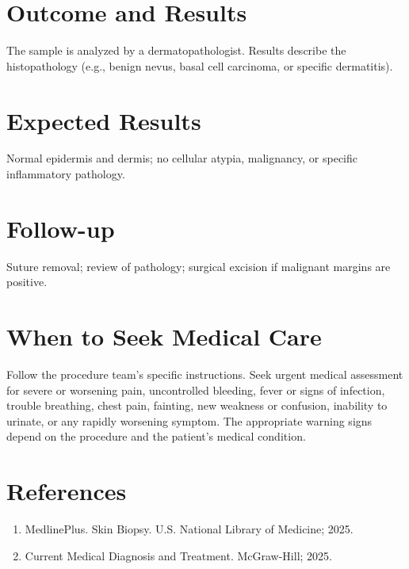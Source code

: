 \section*{Outcome and Results}
The sample is analyzed by a dermatopathologist. Results describe the histopathology (e.g., benign nevus, basal cell carcinoma, or specific dermatitis).

\section*{Expected Results}
Normal epidermis and dermis; no cellular atypia, malignancy, or specific inflammatory pathology.

\section*{Follow-up}
Suture removal; review of pathology; surgical excision if malignant margins are positive.

\section*{When to Seek Medical Care}
Follow the procedure team's specific instructions. Seek urgent medical assessment for severe or worsening pain, uncontrolled bleeding, fever or signs of infection, trouble breathing, chest pain, fainting, new weakness or confusion, inability to urinate, or any rapidly worsening symptom. The appropriate warning signs depend on the procedure and the patient's medical condition.

\section*{References}
\begin{enumerate}
  \item MedlinePlus. Skin Biopsy. U.S. National Library of Medicine; 2025.
  \item Current Medical Diagnosis and Treatment. McGraw-Hill; 2025.
\end{enumerate}

\clearpage
